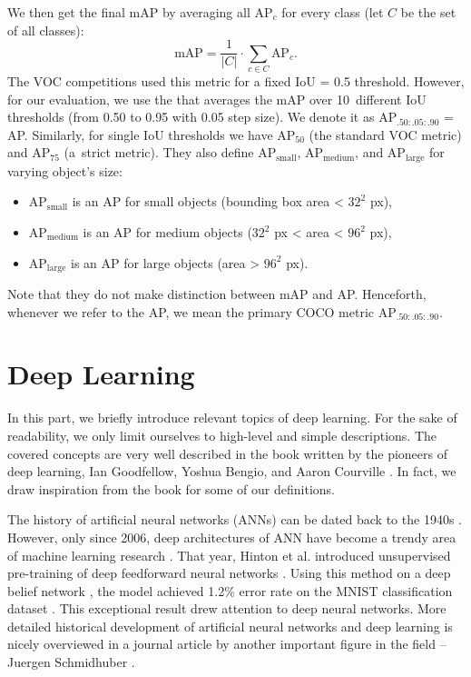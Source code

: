 We then get the final mAP by averaging all AP$_c$ for every class (let $C$ be
the set of all classes):
$$
    \text{mAP} = \frac{1}{\lvert C \rvert} \cdot \sum_{ c\in C} \text{AP}_c.
$$
The VOC competitions \cite{voc} used this metric for a fixed IoU = 0.5 threshold.
However, for our evaluation, we use the 
\cite{coco} that averages the mAP over 10~different IoU thresholds (from 0.50
to 0.95 with 0.05 step size). We denote it as AP$_{.50:.05:.90}$ = AP.
Similarly, for single IoU thresholds we have AP$_{50}$ (the standard VOC metric)
and AP$_{75}$ (a~strict metric). They also define AP$_\text{small}$,
AP$_\text{medium}$, and AP$_\text{large}$ for varying object's size:
\begin{itemize}
    \item AP$_\text{small}$ is an AP for small objects (bounding box area <
          $32^2$ px),
    \item AP$_\text{medium}$ is an AP for medium objects ($32^2$ px < area <
          $96^2$ px),
    \item AP$_\text{large}$ is an AP for large objects (area > $96^2$ px).
\end{itemize}
Note that they do not make distinction between mAP and AP. Henceforth, whenever
we refer to the AP, we mean the primary COCO metric AP$_{.50:.05:.90}$.

\section{Deep Learning}\label{deep_learning_chapter}
In this part, we briefly introduce relevant topics of deep learning. For the
sake of readability, we only limit ourselves to high-level and simple
descriptions. The covered concepts are very well described in the book written
by the pioneers of deep learning, Ian Goodfellow, Yoshua Bengio, and Aaron
Courville \cite{Goodfellow-et-al-2016}. In fact, we draw inspiration from the
book for some of our definitions.

The history of artificial neural networks (ANNs) can be dated back to the 1940s
\cite{McCulloch_1943}. However, only since 2006, deep architectures of ANN have
become a trendy area of machine learning research
\cite{DBLP:journals/corr/Schmidhuber14}. That year, Hinton et al. introduced
unsupervised pre-training of deep feedforward neural networks
\cite{hinton2006reducing}. Using this method on a deep belief network
\cite{DBN}, the model achieved 1.2\% error rate on the MNIST classification
dataset \cite{hinton2006fast, mnist}. This exceptional result drew attention
to deep neural networks. More detailed historical development of artificial
neural networks and deep learning is nicely overviewed in a journal article by
another important figure in the field -- Juergen Schmidhuber
\cite{DBLP:journals/corr/Schmidhuber14}.

